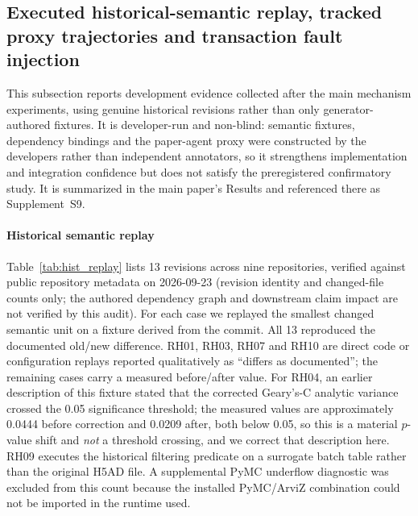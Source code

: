 \documentclass[journal]{IEEEtran}
\begin{document}
\subsection{Executed historical-semantic replay, tracked proxy trajectories and transaction fault injection}
\label{sec:hist_replay_supp}
This subsection reports development evidence collected after the main mechanism experiments, using genuine historical revisions rather than only generator-authored fixtures. It is developer-run and non-blind: semantic fixtures, dependency bindings and the paper-agent proxy were constructed by the developers rather than independent annotators, so it strengthens implementation and integration confidence but does not satisfy the preregistered confirmatory study. It is summarized in the main paper's Results and referenced there as Supplement~S9.

\paragraph{Historical semantic replay} Table~\ref{tab:hist_replay} lists 13 revisions across nine repositories, verified against public repository metadata on 2026-09-23 (revision identity and changed-file counts only; the authored dependency graph and downstream claim impact are not verified by this audit). For each case we replayed the smallest changed semantic unit on a fixture derived from the commit. All 13 reproduced the documented old/new difference. RH01, RH03, RH07 and RH10 are direct code or configuration replays reported qualitatively as ``differs as documented''; the remaining cases carry a measured before/after value. For RH04, an earlier description of this fixture stated that the corrected Geary's-C analytic variance crossed the 0.05 significance threshold; the measured values are approximately 0.0444 before correction and 0.0209 after, both below 0.05, so this is a material $p$-value shift and \emph{not} a threshold crossing, and we correct that description here. RH09 executes the historical filtering predicate on a surrogate batch table rather than the original H5AD file. A supplemental PyMC underflow diagnostic was excluded from this count because the installed PyMC/ArviZ combination could not be imported in the runtime used.
\end{document}
